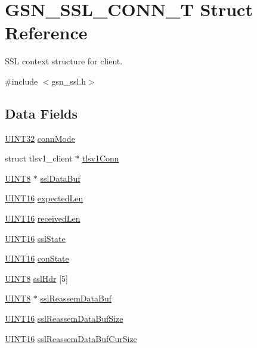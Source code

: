 \hypertarget{a00243}{
\section{GSN\_\-SSL\_\-CONN\_\-T Struct Reference}
\label{a00243}
}


SSL context structure for client.  




{\ttfamily \#include $<$gsn\_\-ssl.h$>$}

\subsection*{Data Fields}
\begin{DoxyCompactItemize}
\item 
\hyperlink{a00660_gae1e6edbbc26d6fbc71a90190d0266018}{UINT32} \hyperlink{a00243_aeff852947f5fd4b9b609d3ef04ebe22a}{connMode}
\item 
struct tlsv1\_\-client $\ast$ \hyperlink{a00243_aaaedca82f634e4192220ccfcad7d066e}{tlsv1Conn}
\item 
\hyperlink{a00660_gab27e9918b538ce9d8ca692479b375b6a}{UINT8} $\ast$ \hyperlink{a00243_afda235c301c31cb0d68392b799e27293}{sslDataBuf}
\item 
\hyperlink{a00660_ga09f1a1fb2293e33483cc8d44aefb1eb1}{UINT16} \hyperlink{a00243_a1a40ca49a468072350c826dc4132855a}{expectedLen}
\item 
\hyperlink{a00660_ga09f1a1fb2293e33483cc8d44aefb1eb1}{UINT16} \hyperlink{a00243_a8ad381330a4d477907ef368e97af5780}{receivedLen}
\item 
\hyperlink{a00660_ga09f1a1fb2293e33483cc8d44aefb1eb1}{UINT16} \hyperlink{a00243_a51862f5394c213c6b8ffaa502455d403}{sslState}
\item 
\hyperlink{a00660_ga09f1a1fb2293e33483cc8d44aefb1eb1}{UINT16} \hyperlink{a00243_acb69cb3fa328edc1fb385aa446668bdd}{conState}
\item 
\hyperlink{a00660_gab27e9918b538ce9d8ca692479b375b6a}{UINT8} \hyperlink{a00243_acb9f7b08bd949dbbea3819d3c24b4524}{sslHdr} \mbox{[}5\mbox{]}
\item 
\hyperlink{a00660_gab27e9918b538ce9d8ca692479b375b6a}{UINT8} $\ast$ \hyperlink{a00243_a7d1ac9fb7decb2b92096b4d1bf688c56}{sslReassemDataBuf}
\item 
\hyperlink{a00660_ga09f1a1fb2293e33483cc8d44aefb1eb1}{UINT16} \hyperlink{a00243_a74c1a364bfc6690c798543c316088c1b}{sslReassemDataBufSize}
\item 
\hyperlink{a00660_ga09f1a1fb2293e33483cc8d44aefb1eb1}{UINT16} \hyperlink{a00243_a5b80cbb76c258b69ef230d9a17e978ac}{sslReassemDataBufCurSize}
\end{DoxyCompactItemize}


